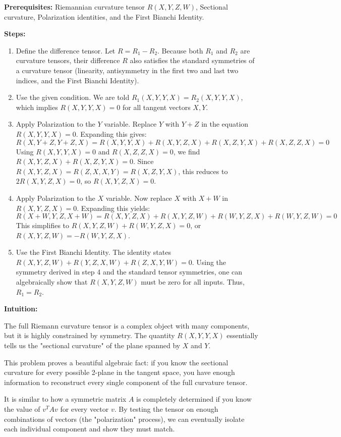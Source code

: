 \begin{solution}
\textbf{Prerequisites:} Riemannian curvature tensor $R(X,Y,Z,W)$, Sectional curvature, Polarization identities, and the First Bianchi Identity.

\textbf{Steps:}
\begin{enumerate}
    \item Define the difference tensor. Let $R = R_1 - R_2$. Because both $R_1$ and $R_2$ are curvature tensors, their difference $R$ also satisfies the standard symmetries of a curvature tensor (linearity, antisymmetry in the first two and last two indices, and the First Bianchi Identity).
    \item Use the given condition. We are told $R_1(X, Y, Y, X) = R_2(X, Y, Y, X)$, which implies $R(X, Y, Y, X) = 0$ for all tangent vectors $X, Y$.
    \item Apply Polarization to the $Y$ variable. Replace $Y$ with $Y+Z$ in the equation $R(X, Y, Y, X) = 0$. Expanding this gives:
    \[ R(X, Y+Z, Y+Z, X) = R(X, Y, Y, X) + R(X, Y, Z, X) + R(X, Z, Y, X) + R(X, Z, Z, X) = 0 \]
    Using $R(X, Y, Y, X) = 0$ and $R(X, Z, Z, X) = 0$, we find $R(X, Y, Z, X) + R(X, Z, Y, X) = 0$. Since $R(X, Y, Z, X) = R(Z, X, X, Y) = R(X, Z, Y, X)$, this reduces to $2R(X, Y, Z, X) = 0$, so $R(X, Y, Z, X) = 0$.
    \item Apply Polarization to the $X$ variable. Now replace $X$ with $X+W$ in $R(X, Y, Z, X) = 0$. Expanding this yields:
    \[ R(X+W, Y, Z, X+W) = R(X, Y, Z, X) + R(X, Y, Z, W) + R(W, Y, Z, X) + R(W, Y, Z, W) = 0 \]
    This simplifies to $R(X, Y, Z, W) + R(W, Y, Z, X) = 0$, or $R(X, Y, Z, W) = -R(W, Y, Z, X)$.
    \item Use the First Bianchi Identity. The identity states $R(X, Y, Z, W) + R(Y, Z, X, W) + R(Z, X, Y, W) = 0$. Using the symmetry derived in step 4 and the standard tensor symmetries, one can algebraically show that $R(X, Y, Z, W)$ must be zero for all inputs. Thus, $R_1 = R_2$.
\end{enumerate}
\textbf{Intuition:}

The full Riemann curvature tensor is a complex object with many components, but it is highly constrained by symmetry. The quantity $R(X, Y, Y, X)$ essentially tells us the "sectional curvature" of the plane spanned by $X$ and $Y$. 

This problem proves a beautiful algebraic fact: if you know the sectional curvature for every possible 2-plane in the tangent space, you have enough information to reconstruct every single component of the full curvature tensor. 

It is similar to how a symmetric matrix $A$ is completely determined if you know the value of $v^T A v$ for every vector $v$. By testing the tensor on enough combinations of vectors (the "polarization" process), we can eventually isolate each individual component and show they must match.
\end{solution}

